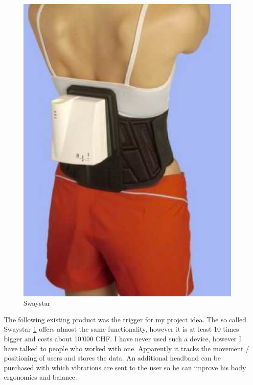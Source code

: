 \begin{figure}
 \vspace{-20pt}
  \begin{center}
\includegraphics[width=\linewidth]{images/Swaystar_01.png}
  \end{center}
  \caption{\label{fig:swaystar}Swaystar}
\end{figure}

The following existing product was the trigger for my project idea. The so called Swaystar \ref{fig:swaystar} offers almost the same functionality, however it is at least 10 times bigger and costs about 10'000 CHF. 
I have never used such a device, however I have talked to people who worked with one. Apparently it tracks the movement / positioning of users and stores the data. An additional headband can be purchased with which vibrations are sent to the user so he can improve his body ergonomics and balance. 


